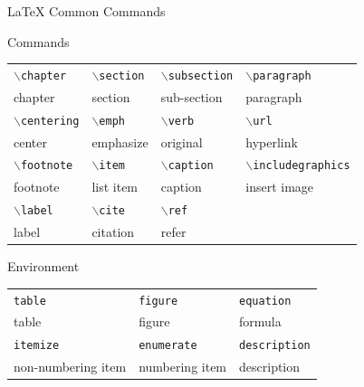 \documentclass{beamer}
\def\cmd#1{\texttt{\color{red}\footnotesize $\backslash$#1}}
\def\env#1{\texttt{\color{blue}\footnotesize #1}}
\begin{document}
\begin{frame}[fragile]{\LaTeX{} Common Commands}
    \begin{exampleblock}{Commands}
        \centering
        \footnotesize
        \begin{tabular}{llll}
            \cmd{chapter} & \cmd{section} & \cmd{subsection} & \cmd{paragraph} \\
            chapter & section & sub-section & paragraph \\\hline
            \cmd{centering} & \cmd{emph} & \cmd{verb} & \cmd{url} \\
            center & emphasize & original & hyperlink \\\hline
            \cmd{footnote} & \cmd{item} & \cmd{caption} & \cmd{includegraphics} \\
            footnote & list item & caption & insert image \\\hline
            \cmd{label} & \cmd{cite} & \cmd{ref} \\
            label & citation & refer\\\hline
        \end{tabular}
    \end{exampleblock}
    \begin{exampleblock}{Environment}
        \centering
        \footnotesize
        \begin{tabular}{lll}
            \env{table} & \env{figure} & \env{equation}\\
            table & figure & formula \\\hline
            \env{itemize} & \env{enumerate} & \env{description}\\
            non-numbering item & numbering item & description \\\hline
        \end{tabular}
    \end{exampleblock}
\end{frame}
\end{document}
